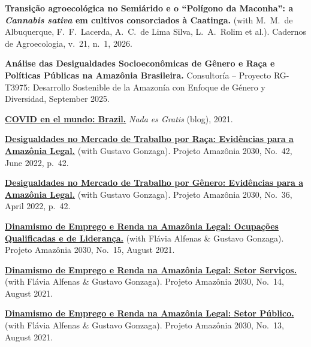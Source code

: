 \documentclass[a4paper,9pt]{article}
\newcommand{\cvgap}{\vspace{2mm}}
\begin{document}
\begin{flushleft}

\textbf{Transição agroecológica no Semiárido e o ``Polígono da Maconha'': a \emph{Cannabis sativa} em cultivos consorciados à Caatinga.} (with M.~M.~de Albuquerque, F.~F.~Lacerda, A.~C.~de Lima Silva, L.~A.~Rolim et al.). Cadernos de Agroecologia, v.~21, n.~1, 2026.

\cvgap

\textbf{Análise das Desigualdades Socioeconômicas de Gênero e Raça e Políticas Públicas na Amazônia Brasileira.} Consultoría -- Proyecto RG-T3975: Desarrollo Sostenible de la Amazonía con Enfoque de Género y Diversidad, September 2025.

\cvgap

\textbf{\href{https://nadaesgratis.es/judit-vall/covid-en-el-mundo-brazil}{COVID en el mundo: Brazil.}} \emph{Nada es Gratis} (blog), 2021.

\cvgap

\textbf{\href{https://amazonia2030.org.br/desigualdades-no-mercado-de-trabalho-por-raca-evidencias-para-a-amazonia-legal/}{Desigualdades no Mercado de Trabalho por Raça: Evidências para a Amazônia Legal.}} (with Gustavo Gonzaga). Projeto Amazônia 2030, No.~42, June 2022, p.~42.

\cvgap

\textbf{\href{https://amazonia2030.org.br/desigualdades-no-mercado-de-trabalho-por-genero-evidencias-para-a-amazonia-legal/}{Desigualdades no Mercado de Trabalho por Gênero: Evidências para a Amazônia Legal.}} (with Gustavo Gonzaga). Projeto Amazônia 2030, No.~36, April 2022, p.~42.

\cvgap

\textbf{\href{https://amazonia2030.org.br/dinamismo-de-emprego-e-renda-na-amazonia-legal-ocupacoes-qualificadas-e-de-lideranca/}{Dinamismo de Emprego e Renda na Amazônia Legal: Ocupações Qualificadas e de Liderança.}} (with Flávia Alfenas \& Gustavo Gonzaga). Projeto Amazônia 2030, No.~15, August 2021.

\cvgap

\textbf{\href{https://amazonia2030.org.br/dinamismo-de-emprego-e-renda-na-amazonia-legal-servicos/}{Dinamismo de Emprego e Renda na Amazônia Legal: Setor Serviços.}} (with Flávia Alfenas \& Gustavo Gonzaga). Projeto Amazônia 2030, No.~14, August 2021.

\cvgap

\textbf{\href{https://amazonia2030.org.br/dinamismo-de-emprego-e-renda-na-amazonia-legal-setor-publico/}{Dinamismo de Emprego e Renda na Amazônia Legal: Setor Público.}} (with Flávia Alfenas \& Gustavo Gonzaga). Projeto Amazônia 2030, No.~13, August 2021.


\end{flushleft}
\end{document}
